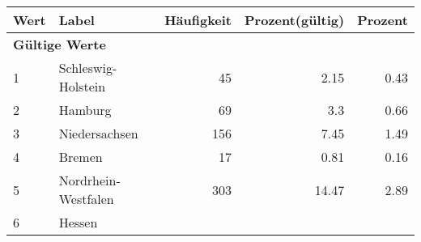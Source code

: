      \begin{longtable}{lXrrr}
     \toprule
     \textbf{Wert} & \textbf{Label} & \textbf{Häufigkeit} & \textbf{Prozent(gültig)} & \textbf{Prozent} \\
     \endhead
     \midrule
     \multicolumn{5}{l}{\textbf{Gültige Werte}}\\

     1 &
     \multicolumn{1}{X}{ Schleswig-Holstein   } &


       \num{45} &
       \num[round-mode=places,round-precision=2]{2,15} &
         \num[round-mode=places,round-precision=2]{0,43} \\

     2 &
     \multicolumn{1}{X}{ Hamburg   } &


       \num{69} &
       \num[round-mode=places,round-precision=2]{3,3} &
         \num[round-mode=places,round-precision=2]{0,66} \\

     3 &
     \multicolumn{1}{X}{ Niedersachsen   } &


       \num{156} &
       \num[round-mode=places,round-precision=2]{7,45} &
         \num[round-mode=places,round-precision=2]{1,49} \\

     4 &
     \multicolumn{1}{X}{ Bremen   } &


       \num{17} &
       \num[round-mode=places,round-precision=2]{0,81} &
         \num[round-mode=places,round-precision=2]{0,16} \\

     5 &
     \multicolumn{1}{X}{ Nordrhein-Westfalen   } &


       \num{303} &
       \num[round-mode=places,round-precision=2]{14,47} &
         \num[round-mode=places,round-precision=2]{2,89} \\

     6 &
     \multicolumn{1}{X}{ Hessen   } &



\end{longtable}
